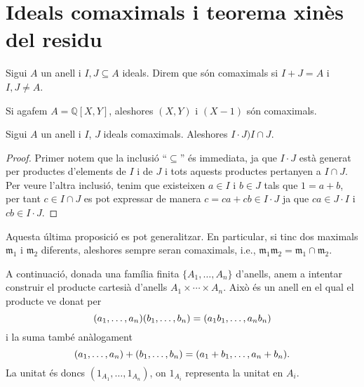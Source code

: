 \documentclass[../../../main.tex]{subfiles}
\begin{document}
\section{Ideals comaximals i teorema xinès del residu}


\begin{defi}
\label{def:idealscomaximals} Sigui $A$ un anell i $I,J\subseteq A$ ideals. Direm que són comaximals si $I+J = A$ i $I,J\not=A$.
\end{defi}

\begin{ej}
Si agafem $A = \mathbb{Q}[X,Y]$, aleshores $(X,Y)$ i $(X-1)$ són comaximals.
\end{ej}

\begin{prop}
\label{prop:comaximals} Sigui $A$ un anell i $I$, $J$ ideals comaximals. Aleshores $I\cdotp J ) I\cap J$.
\end{prop}
\begin{proof}
Primer notem que la inclusió ``$\subseteq$'' és immediata, ja que $I\cdotp J$ està generat per productes d'elements de $I$ i de $J$ i tots aquests productes pertanyen a $I\cap J$. Per veure l'altra inclusió, tenim que existeixen $a\in I$ i $b\in J$ tals que $1 = a+b$, per tant $c\in I\cap J$ es pot expressar de manera $c = ca+cb\in I\cdotp J$ ja que $ca\in J\cdotp I$ i $cb\in I\cdotp J$.
\end{proof}

Aquesta última proposició es pot generalitzar. En particular, si tinc dos maximals $\mathfrak{m}_1$ i $\mathfrak{m}_2$ diferents, aleshores sempre seran comaximals, i.e., $\mathfrak{m}_1\mathfrak{m}_2 = \mathfrak{m}_1\cap\mathfrak{m}_2$.

A continuació, donada una família finita $\{A_1,\ldots,A_n\}$ d'anells, anem a intentar construir el producte cartesià d'anells $A_1\times\cdots\times A_n$. Això és un anell en el qual el producte ve donat per
\begin{equation}
    \notag
    (a_1,\ldots,a_n)(b_1,\ldots,b_n) = (a_1b_1,\ldots,a_nb_n)
\end{equation}
i la suma també anàlogament
\begin{equation}
    \notag
    (a_1,\ldots,a_n)+(b_1,\ldots,b_n) = (a_1+b_1,\ldots,a_n+b_n).
\end{equation}
La unitat és doncs $(1_{A_1},\ldots,1_{A_n})$, on $1_{A_i}$ representa la unitat en $A_i$.
\end{document}
